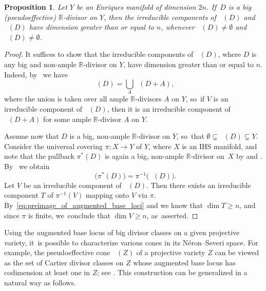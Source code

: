 \documentclass[JEP,XML,SOM,Unicode,published]{cedram}
\theoremstyle{plain}
\newtheorem{prop}[thm]{Proposition}
\theoremstyle{definition}
\newcommand{\R}{\mathbb{R}}
\DeclareMathOperator{\Pseff}{\overline{\mathrm{Eff}}}
\DeclareMathOperator{\dbs}{\boldsymbol{B}_{--}}
\DeclareMathOperator{\abs}{\boldsymbol{B}_{+}}
\begin{document}
\begin{prop}
\label{prop:abl_Enriques}
Let $Y$ be an Enriques manifold of dimension $2n$. If~$D$ is a big (\resp pseudoeffective) $\R$\nobreakdash-divisor on $Y$, then the irreducible components of $\abs(D)$ and $\dbs(D)$ have dimension greater than or equal to $n$, whenever $\abs(D) \neq \emptyset$ and $\dbs(D) \neq \emptyset$.
\end{prop}

\begin{proof}
It suffices to show that the irreducible components of $\abs(D)$, where $D$ is any big and non-ample $\R$\nobreakdash-divisor on $Y$, have dimension greater than or equal to $n$. Indeed, by~\cite[Lem.\,1.14]{ELMNP06} we have
\[
\dbs(D)= \bigcup_{A} \abs(D+A),
\]
where the union is taken over all ample $\R$\nobreakdash-divisors $A$ on $Y$, so~if $V$ is an irreducible component of $\dbs(D)$, then it is an irreducible component of $\abs(D+A)$ for some ample $\R$\nobreakdash-divisor $A$ on $Y$.

Assume now that $D$ is a big, non-ample $\R$\nobreakdash-divisor on $Y$, so~that $\emptyset \subsetneq \abs(D) \subsetneq Y$. Consider the universal covering $\pi \colon X \to Y$ of $Y$, where $X$ is an IHS manifold, and note that the pullback $\pi^*(D)$ is again a big, non-ample $\R$\nobreakdash-divisor on~$X$ by \cite[Cor.\,1.2.28]{Laz04book_I} and \cite[Prop.\,2.9(1)]{Kuronya06}. By~\cite[Th.\,1.1(1.1.2)]{Gomez25} we obtain
\begin{equation}
\label{eq:preimage_of_augmented_base_loci}
\abs \bigl(\pi^*(D) \bigr) = \pi^{-1} \bigl(\abs(D) \bigr).
\end{equation}
Let $V$ be an irreducible component of $\abs(D)$. Then there exists an irreducible component $T$ of $\pi^{-1}(V)$ mapping onto $V$ via $\pi$. By~\eqref{eq:preimage_of_augmented_base_loci} and \cite[Th.\,A(1)]{DRO25} we know that $\dim T \geq n$, and since $\pi$ is finite, we~conclude that $\dim V \geq n$, as~asserted.
\end{proof}

Using the augmented base locus of big divisor classes on a given projective variety, it~is possible to characterize various cones in its Néron--Severi space. For example, the pseudoeffective cone $\Pseff(Z)$ of a projective variety $Z$ can be viewed as the set of Cartier divisor classes on $Z$ whose augmented base locus has codimension at least one in $Z$; see \cite[Ex.\,1.7 \& Ex.\,1.18]{ELMNP06}. This construction can be generalized in a natural way as follows.
\end{document}
